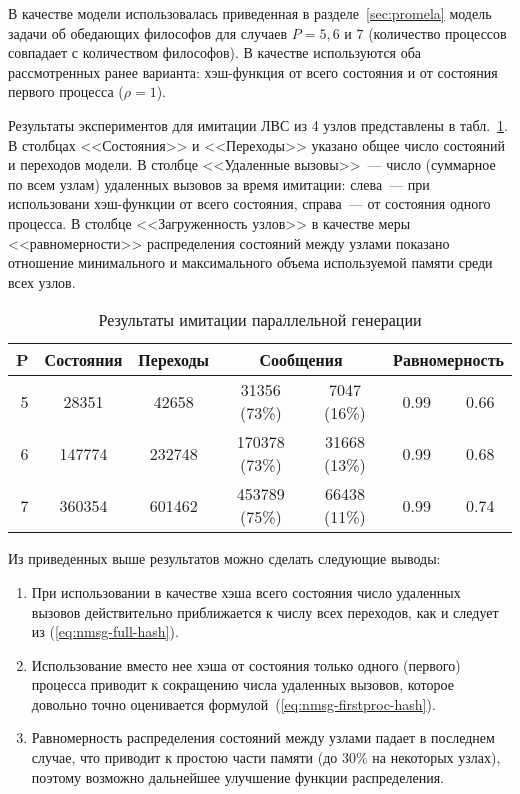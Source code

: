 В качестве модели использовалась приведенная в разделе~\ref{sec:promela} модель задачи об
обедающих философов для случаев $P = 5, 6\text{~и~}7$ (количество процессов совпадает с
количеством философов). В качестве  используются оба рассмотренных ранее
варианта: хэш-функция от всего состояния и от состояния первого процесса ($\rho = 1$).

Результаты экспериментов для имитации ЛВС из 4 узлов представлены в
табл.~\ref{tab:paremu-stats}. В столбцах <<Состояния>> и <<Переходы>> указано общее число
состояний и переходов модели. В столбце <<Удаленные вызовы>>~--- число (суммарное по всем
узлам) удаленных вызовов за время имитации: слева~--- при использовани хэш-функции от
всего состояния, справа~--- от состояния одного процесса. В столбце <<Загруженность
узлов>> в качестве меры <<равномерности>> распределения состояний между узлами показано
отношение минимального и максимального объема используемой памяти среди всех узлов.

\begin{table}[ht]
  \centering
  \begin{tabular}[ht]{|r|c|c|c|c|c|c|}
    \hline
    P & Состояния & Переходы & \multicolumn{2}{|c|}{Сообщения} & \multicolumn{2}{|c|}{Равномерность}    \\
    \hline
    5 & 28351     & 42658    & 31356  (73\%) & 7047  (16\%) & 0.99 & 0.66 \\ 
    6 & 147774    & 232748   & 170378 (73\%) & 31668 (13\%) & 0.99 & 0.68 \\ 
    7 & 360354    & 601462   & 453789 (75\%) & 66438 (11\%) & 0.99 & 0.74 \\ 
    \hline
  \end{tabular}
  \caption{Результаты имитации параллельной генерации}
  \label{tab:paremu-stats}
\end{table}

Из приведенных выше результатов можно сделать следующие выводы:

\begin{enumerate}
\item При использовании в качестве  хэша всего состояния число
  удаленных вызовов действительно приближается к числу всех переходов, как и
  следует из (\ref{eq:nmsg-full-hash}).

\item Использование вместо нее хэша от состояния только одного (первого) процесса приводит
  к сокращению числа удаленных вызовов, которое довольно точно оценивается
  формулой~(\ref{eq:nmsg-firstproc-hash}).

\item Равномерность распределения состояний между узлами падает в последнем
  случае, что приводит к простою части памяти  (до 30\% на некоторых узлах),
  поэтому возможно дальнейшее улучшение функции распределения.
\end{enumerate}

